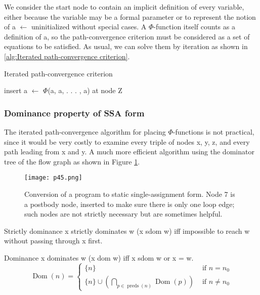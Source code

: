 We consider the start node to contain an implicit definition of every variable, either because the variable may be a formal parameter or to represent the notion of a 
$\leftarrow$ uninitialized without special cases. A $\Phi$-function itself counts as a definition of a, so the path-convergence criterion must be considered as a set of equations to be satisfied. As usual, we can solve them by iteration as shown in \ref{alg:Iterated path-convergence criterion}.


\begin{algorithm}
\caption{Iterated path-convergence criterion}\label{alg:Iterated path-convergence criterion}
\begin{algorithmic}

\State  insert a $\leftarrow$ $\Phi$(a, a, . . . , a) at node Z
\EndWhile
\end{algorithmic}
\end{algorithm}

\subsubsection{Dominance property of SSA form}

The iterated path-convergence algorithm for placing $\Phi$-functions is not practical, since it would be very costly to examine every triple of nodes x, y, z, and every path leading from x and y.  A much more efficient algorithm using the dominator tree of the flow graph as shown in Figure \ref{fig:p45}.


\begin{figure}[H]
    \centering
    \texttt{[image: p45.png]}
    \caption{ Conversion of a program to static single-assignment form. Node 7 is a postbody node, inserted to make sure there is only one loop edge; such nodes are not strictly necessary but are sometimes helpful.}
    \label{fig:p45}

\end{figure}


\begin{definition}{Strictly dominance}
    x strictly dominates w (x sdom w) iff impossible to reach w without passing through x first.
\end{definition}

\begin{definition}{Dominance}
    x  dominates w (x dom w) iff x sdom w or x = w.
$$
\operatorname{Dom}(n)= \begin{cases}\{n\} & \text { if } n=n_0 \\ \{n\} \cup\left(\bigcap_{p \in \operatorname{preds}(n)} \operatorname{Dom}(p)\right) & \text { if } n \neq n_0\end{cases}
$$
\end{definition}


